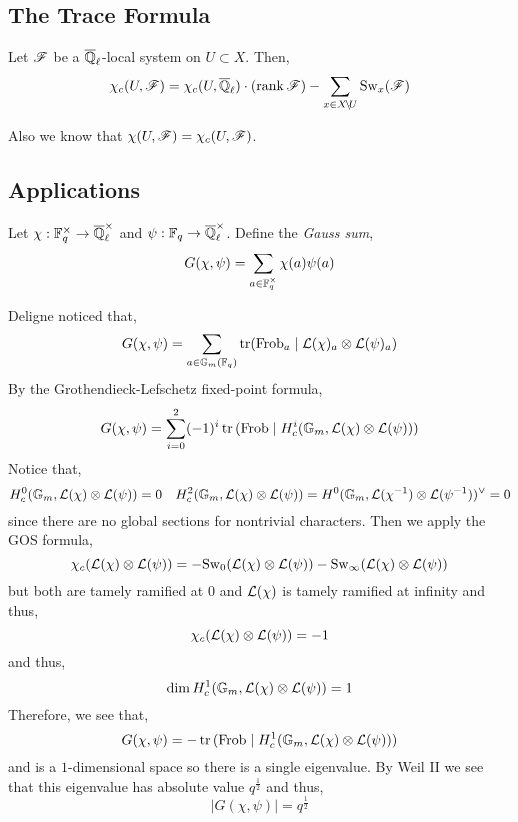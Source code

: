 \documentclass[12pt]{article}
\begin{document}
\subsection{The Trace Formula}

\begin{theorem}
Let $\mathscr{F}$ be a $\overline{\mathbb{Q}}_\ell$-local system on $U \subset X$. Then,
\[ \chi_c(U, \mathscr{F}) = \chi_c(U, \overline{\mathbb{Q}}_\ell) \cdot (\operatorname{\mathrm{rank}} \mathscr{F}) - \sum_{x \in X \! \setminus \! U} \mathrm{Sw}_x(\mathscr{F}) \]
\end{theorem}

\begin{rmk}
Also we know that $\chi(U, \mathscr{F}) = \chi_c(U, \mathscr{F})$.
\end{rmk}

\subsection{Applications}

\begin{defn}
Let $\chi : \mathbb{F}_q^\times \to \overline{\mathbb{Q}}_\ell^\times$ and $\psi : \mathbb{F}_q \to \overline{\mathbb{Q}}_\ell^\times$. Define the \textit{Gauss sum},
\[ G(\chi, \psi) = \sum_{a \in \mathbb{F}_q^\times} \chi(a) \psi(a) \]
\end{defn}

\newcommand{\Frob}{\mathrm{Frob}}

\begin{rmk}
Deligne noticed that,
\[ G(\chi, \psi) = \sum_{a \in \Gm(\FF_q)} \tr (\Frob_a \mid \L(\chi)_a \ot \L(\psi)_a) \]
By the Grothendieck-Lefschetz fixed-point formula,
\[ G(\chi, \psi) = \sum_{i = 0}^2 (-1)^i \tr{(\Frob \mid H^i_c(\Gm, \L(\chi) \ot \L(\psi)))} \]
Notice that,
\[ H^0_c(\mathbb{G}_m, \mathcal{L}(\chi) \otimes \mathcal{L}(\psi)) = 0 \quad H^2_c(\mathbb{G}_m, \mathcal{L}(\chi) \otimes \mathcal{L}(\psi)) = H^0(\mathbb{G}_m, \mathcal{L}(\chi^{-1}) \otimes \mathcal{L}(\psi^{-1}))^\vee = 0 \]
since there are no global sections for nontrivial characters. Then we apply the GOS formula,
\[ \chi_c(\mathcal{L}(\chi) \otimes \mathcal{L}(\psi)) = - \mathrm{Sw}_0(\mathcal{L}(\chi) \otimes \mathcal{L}(\psi)) - \mathrm{Sw}_\infty(\mathcal{L}(\chi) \otimes \mathcal{L}(\psi)) \]
but both are tamely ramified at $0$ and $\mathcal{L}(\chi)$ is tamely ramified at infinity and thus,
\[ \chi_c(\mathcal{L}(\chi) \otimes \mathcal{L}(\psi)) = - 1 \]
and thus,
\[ \dim H^1_c(\mathbb{G}_m, \mathcal{L}(\chi) \otimes \mathcal{L}(\psi)) = 1 \]
Therefore, we see that,
\[ G(\chi, \psi) = - \tr{(\Frob \mid H_c^1(\Gm, \L(\chi) \ot \L(\psi)))} \]
and is a $1$-dimensional space so there is a single eigenvalue. By Weil II we see that this eigenvalue has absolute value $q^{\frac{1}{2}}$ and thus,
\[ |G(\chi, \psi)| = q^{\frac{1}{2}} \]
\end{rmk}
\end{document}

